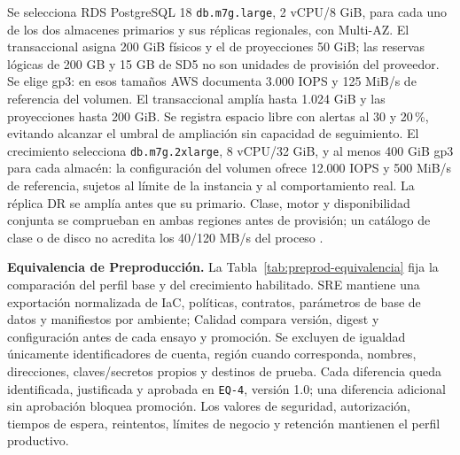 Se selecciona RDS PostgreSQL 18 \texttt{db.m7g.large}, 2 vCPU/8 GiB, para cada uno de los dos almacenes primarios y sus réplicas regionales, con Multi-AZ. El transaccional asigna 200 GiB físicos y el de proyecciones 50 GiB; las reservas lógicas de 200 GB y 15 GB de SD5 no son unidades de provisión del proveedor. Se elige gp3: en esos tamaños AWS documenta 3.000 IOPS y 125 MiB/s de referencia del volumen. El transaccional amplía hasta 1.024 GiB y las proyecciones hasta 200 GiB. Se registra espacio libre con alertas al 30 y 20\,\%, evitando alcanzar el umbral de ampliación sin capacidad de seguimiento. El crecimiento selecciona \texttt{db.m7g.2xlarge}, 8 vCPU/32 GiB, y al menos 400 GiB gp3 para cada almacén: la configuración del volumen ofrece 12.000 IOPS y 500 MiB/s de referencia, sujetos al límite de la instancia y al comportamiento real. La réplica DR se amplía antes que su primario. Clase, motor y disponibilidad conjunta se comprueban en ambas regiones antes de provisión; un catálogo de clase o de disco no acredita los 40/120 MB/s del proceso \parencites{c8-rds-clases,c8-rds-almacenamiento}.

\textbf{Equivalencia de Preproducción.}
La Tabla~\ref{tab:preprod-equivalencia} fija la comparación del perfil base y del crecimiento habilitado. SRE mantiene una exportación normalizada de IaC, políticas, contratos, parámetros de base de datos y manifiestos por ambiente; Calidad compara versión, digest y configuración antes de cada ensayo y promoción. Se excluyen de igualdad únicamente identificadores de cuenta, región cuando corresponda, nombres, direcciones, claves/secretos propios y destinos de prueba. Cada diferencia queda identificada, justificada y aprobada en \texttt{EQ-4}, versión 1.0; una diferencia adicional sin aprobación bloquea promoción. Los valores de seguridad, autorización, tiempos de espera, reintentos, límites de negocio y retención mantienen el perfil productivo.

